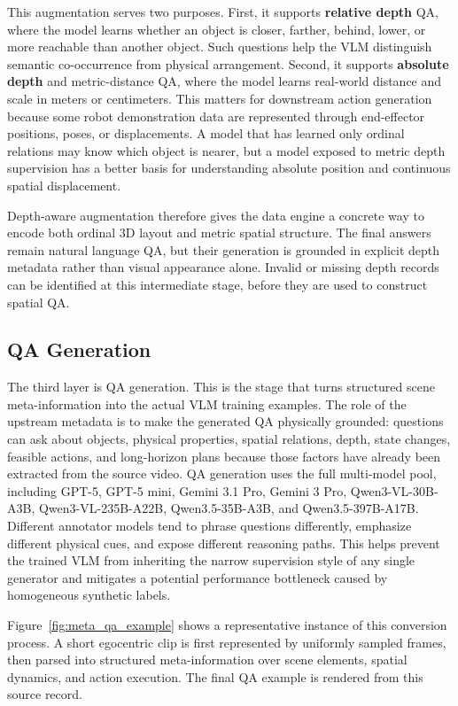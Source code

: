 This augmentation serves two purposes. First, it supports \textbf{relative depth} QA, where the model learns whether an object is closer, farther, behind, lower, or more reachable than another object. Such questions help the VLM distinguish semantic co-occurrence from physical arrangement. Second, it supports \textbf{absolute depth} and metric-distance QA, where the model learns real-world distance and scale in meters or centimeters. This matters for downstream action generation because some robot demonstration data are represented through end-effector positions, poses, or displacements. A model that has learned only ordinal relations may know which object is nearer, but a model exposed to metric depth supervision has a better basis for understanding absolute position and continuous spatial displacement.

Depth-aware augmentation therefore gives the data engine a concrete way to encode both ordinal 3D layout and metric spatial structure. The final answers remain natural language QA, but their generation is grounded in explicit depth metadata rather than visual appearance alone. Invalid or missing depth records can be identified at this intermediate stage, before they are used to construct spatial QA.

\subsection{QA Generation}

The third layer is QA generation. This is the stage that turns structured scene meta-information into the actual VLM training examples. The role of the upstream metadata is to make the generated QA physically grounded: questions can ask about objects, physical properties, spatial relations, depth, state changes, feasible actions, and long-horizon plans because those factors have already been extracted from the source video. QA generation uses the full multi-model pool, including GPT-5, GPT-5 mini, Gemini 3.1 Pro, Gemini 3 Pro, Qwen3-VL-30B-A3B, Qwen3-VL-235B-A22B, Qwen3.5-35B-A3B, and Qwen3.5-397B-A17B. Different annotator models tend to phrase questions differently, emphasize different physical cues, and expose different reasoning paths. This helps prevent the trained VLM from inheriting the narrow supervision style of any single generator and mitigates a potential performance bottleneck caused by homogeneous synthetic labels.

Figure~\ref{fig:meta_qa_example} shows a representative instance of this conversion process. A short egocentric clip is first represented by uniformly sampled frames, then parsed into structured meta-information over scene elements, spatial dynamics, and action execution. The final QA example is rendered from this source record.

